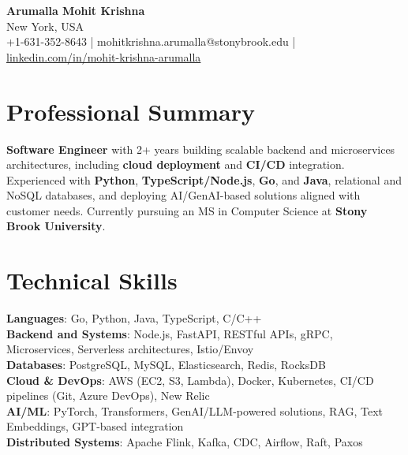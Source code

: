 \documentclass[letterpaper,11pt]{article}
\begin{document}
\begin{center}
  {\Large \textbf{Arumalla Mohit Krishna}} \\
  New York, USA \\
  +1-631-352-8643 \enspace | \enspace mohitkrishna.arumalla@stonybrook.edu \enspace | \enspace \href{https://www.linkedin.com/in/mohit-krishna-arumalla}{linkedin.com/in/mohit-krishna-arumalla}
\end{center}

\section{Professional Summary}
  \begin{itemize}[leftmargin=0.15in, label={}]
    \small{\item{
     \textbf{Software Engineer} with 2+ years building scalable backend and microservices architectures, including \textbf{cloud deployment} and \textbf{CI/CD} integration. Experienced with \textbf{Python}, \textbf{TypeScript/Node.js}, \textbf{Go}, and \textbf{Java}, relational and NoSQL databases, and deploying AI/GenAI-based solutions aligned with customer needs. Currently pursuing an MS in Computer Science at \textbf{Stony Brook University}.
    }}
  \end{itemize}
\vspace{-16pt}

\section{Technical Skills}
 \begin{itemize}[leftmargin=0.15in, label={}]
    \small{\item{
     \textbf{Languages}: Go, Python, Java, TypeScript, C/C++ \\
     \textbf{Backend and Systems}: Node.js, FastAPI, RESTful APIs, gRPC, Microservices, Serverless architectures, Istio/Envoy \\
     \textbf{Databases}: PostgreSQL, MySQL, Elasticsearch, Redis, RocksDB \\
     \textbf{Cloud \& DevOps}: AWS (EC2, S3, Lambda), Docker, Kubernetes, CI/CD pipelines (Git, Azure DevOps), New Relic \\
     \textbf{AI/ML}: PyTorch, Transformers, GenAI/LLM-powered solutions, RAG, Text Embeddings, GPT-based integration \\
     \textbf{Distributed Systems}: Apache Flink, Kafka, CDC, Airflow, Raft, Paxos
    }}
 \end{itemize}
\vspace{-16pt}
\end{document}
